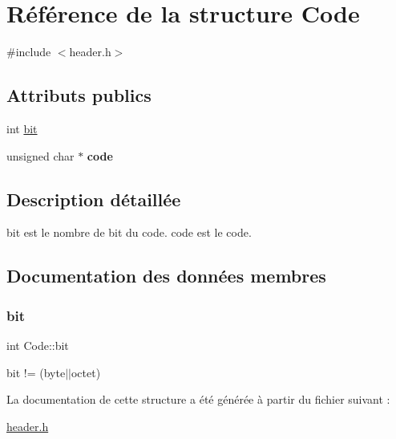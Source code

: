 \hypertarget{structCode}{}\section{Référence de la structure Code}
\label{structCode}


{\ttfamily \#include $<$header.\+h$>$}

\subsection*{Attributs publics}
\begin{DoxyCompactItemize}
\item 
int \hyperlink{structCode_a2a982a26130ccdf0c62a00b39bad7f15}{bit}
\item 
\mbox{\label{structCode_a8f7398fe11db54f06d78147978f75a13}} 
unsigned char $\ast$ {\bfseries code}
\end{DoxyCompactItemize}


\subsection{Description détaillée}
bit est le nombre de bit du code. code est le code. 

\subsection{Documentation des données membres}
\mbox{\label{structCode_a2a982a26130ccdf0c62a00b39bad7f15}} 
\subsubsection{\texorpdfstring{bit}{bit}}
{\footnotesize\ttfamily int Code\+::bit}

bit != (byte$\vert$$\vert$octet) 

La documentation de cette structure a été générée à partir du fichier suivant \+:\begin{DoxyCompactItemize}
\item 
\hyperlink{header_8h}{header.\+h}\end{DoxyCompactItemize}

